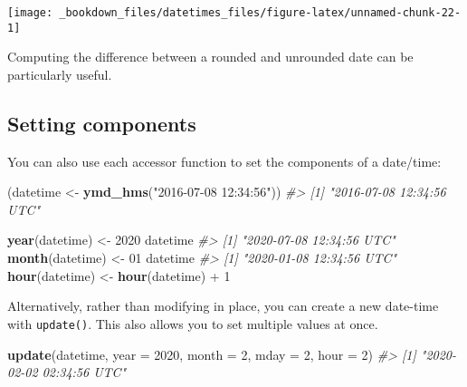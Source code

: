 \documentclass[]{book}
\newenvironment{Shaded}{\begin{snugshade}}{\end{snugshade}}
\newcommand{\KeywordTok}[1]{\textcolor[rgb]{0.13,0.29,0.53}{\textbf{{#1}}}}
\newcommand{\DataTypeTok}[1]{\textcolor[rgb]{0.13,0.29,0.53}{{#1}}}
\newcommand{\DecValTok}[1]{\textcolor[rgb]{0.00,0.00,0.81}{{#1}}}
\newcommand{\StringTok}[1]{\textcolor[rgb]{0.31,0.60,0.02}{{#1}}}
\newcommand{\CommentTok}[1]{\textcolor[rgb]{0.56,0.35,0.01}{\textit{{#1}}}}
\newcommand{\NormalTok}[1]{{#1}}
\begin{document}
\begin{Shaded}
\end{Shaded}

\begin{center}\texttt{[image: \_bookdown\_files/datetimes\_files/figure-latex/unnamed-chunk-22-1]} \end{center}

Computing the difference between a rounded and unrounded date can be
particularly useful.

\subsection{Setting components}\label{setting-components}

You can also use each accessor function to set the components of a
date/time:

\begin{Shaded}
\begin{Highlighting}[]
\NormalTok{(datetime <-}\StringTok{ }\KeywordTok{ymd_hms}\NormalTok{(}\StringTok{"2016-07-08 12:34:56"}\NormalTok{))}
\CommentTok{#> [1] "2016-07-08 12:34:56 UTC"}

\KeywordTok{year}\NormalTok{(datetime) <-}\StringTok{ }\DecValTok{2020}
\NormalTok{datetime}
\CommentTok{#> [1] "2020-07-08 12:34:56 UTC"}
\KeywordTok{month}\NormalTok{(datetime) <-}\StringTok{ }\DecValTok{01}
\NormalTok{datetime}
\CommentTok{#> [1] "2020-01-08 12:34:56 UTC"}
\KeywordTok{hour}\NormalTok{(datetime) <-}\StringTok{ }\KeywordTok{hour}\NormalTok{(datetime) +}\StringTok{ }\DecValTok{1}
\end{Highlighting}
\end{Shaded}

Alternatively, rather than modifying in place, you can create a new
date-time with \texttt{update()}. This also allows you to set multiple
values at once.

\begin{Shaded}
\begin{Highlighting}[]
\KeywordTok{update}\NormalTok{(datetime, }\DataTypeTok{year =} \DecValTok{2020}\NormalTok{, }\DataTypeTok{month =} \DecValTok{2}\NormalTok{, }\DataTypeTok{mday =} \DecValTok{2}\NormalTok{, }\DataTypeTok{hour =} \DecValTok{2}\NormalTok{)}
\CommentTok{#> [1] "2020-02-02 02:34:56 UTC"}
\end{Highlighting}
\end{Shaded}
\end{document}
